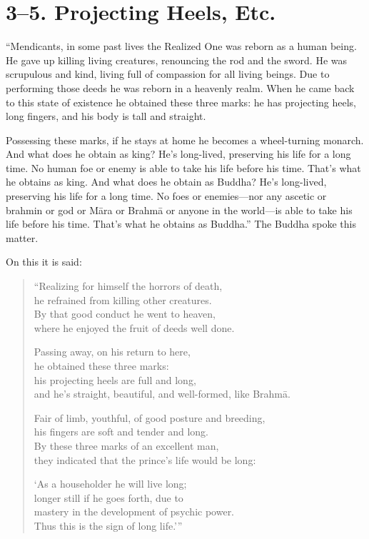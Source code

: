 \documentclass[12pt,openany]{book}%
\begin{document}
\section*{3–5. Projecting Heels, Etc. }

“Mendicants, in some past lives the Realized One was reborn as a human being. He gave up killing living creatures, renouncing the rod and the sword. He was scrupulous and kind, living full of compassion for all living beings. Due to performing those deeds he was reborn in a heavenly realm. When he came back to this state of existence he obtained these three marks: he has projecting heels, long fingers, and his body is tall and straight. 

Possessing these marks, if he stays at home he becomes a wheel-turning monarch. And what does he obtain as king? He’s long-lived, preserving his life for a long time. No human foe or enemy is able to take his life before his time. That’s what he obtains as king. And what does he obtain as Buddha? He’s long-lived, preserving his life for a long time. No foes or enemies—nor any ascetic or brahmin or god or \textsanskrit{Māra} or \textsanskrit{Brahmā} or anyone in the world—is able to take his life before his time. That’s what he obtains as Buddha.” The Buddha spoke this matter. 

On this it is said: 

\begin{verse}%
“Realizing for himself the horrors of death, \\
he refrained from killing other creatures. \\
By that good conduct he went to heaven, \\
where he enjoyed the fruit of deeds well done. 

Passing away, on his return to here, \\
he obtained these three marks: \\
his projecting heels are full and long, \\
and he’s straight, beautiful, and well-formed, like \textsanskrit{Brahmā}. 

Fair of limb, youthful, of good posture and breeding, \\
his fingers are soft and tender and long. \\
By these three marks of an excellent man, \\
they indicated that the prince’s life would be long: 

‘As a householder he will live long; \\
longer still if he goes forth, due to \\
mastery in the development of psychic power. \\
Thus this is the sign of long life.’” 

%
\end{verse}
\end{document}
